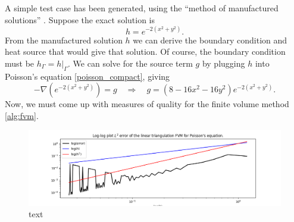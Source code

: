 A simple test case has been generated, using the ``method of manufactured solutions'' \cite{fenics_tutorial}.
Suppose the exact solution is
$$
    h = e^{-2(x^2 + y^2)}.
$$
From the manufactured solution $h$ we can derive the boundary condition and heat source that would give that solution.
Of course, the boundary condition must be $h_\Gamma = \left.h\right|_\Gamma$. We can solve for the source term $g$ by
plugging $h$ into Poisson's equation \eqref{poisson_compact}, giving
$$
    -\nabla\left(e^{-2(x^2 + y^2)}\right) = g \quad \Rightarrow \quad g = \left(8 - 16x^2 - 16y^2\right)e^{-2(x^2 + y^2)}.
$$
Now, we must come up with measures of quality for the finite volume method \ref{alg:fvm}.


\begin{figure}[H]
    \begin{center}
        \includegraphics[width=1\linewidth]{figures/graphs/error_fvm_1.png}
    \end{center}
    \caption{\scriptsize
        text
    }
    \label{error_fvm_1}
\end{figure}




